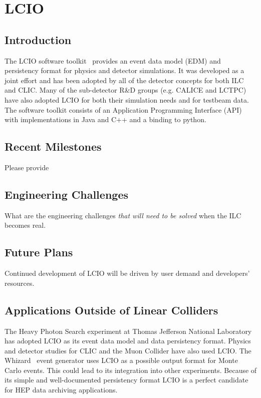 \section{LCIO}

\subsection{Introduction}

The LCIO software toolkit~\cite{lcioWebsite} provides an event data model
(EDM) and persistency format for physics and detector
simulations. It was developed as a joint effort and has
been adopted by all of the detector concepts for both ILC and CLIC. Many of the sub-detector R\&D groups (e.g. CALICE and LCTPC) have also adopted LCIO for both their simulation needs and for testbeam data. The
software toolkit consists of an Application Programming Interface (API) with implementations in Java and C++ and a binding to python.
\subsection{Recent Milestones}
{\color{red} Please provide}
\subsection{Engineering Challenges}
{\color{red} What are the engineering challenges \emph{that will need to be solved} when the ILC becomes real.}

\subsection{Future Plans}
Continued development of LCIO will be driven by user demand and developers' resources.

\subsection{Applications Outside of Linear Colliders}
The Heavy Photon Search experiment at Thomas Jefferson National Laboratory
has adopted LCIO as its event data model and data persistency format. Physics
and detector studies for CLIC and the Muon Collider have also used LCIO.
The Whizard~\cite{whizardWebsite} event generator uses LCIO as a possible output format for Monte Carlo events. This could lead
to its integration into other experiments. Because of its simple and
well-documented persistency format LCIO is a perfect candidate for HEP data
archiving applications.
